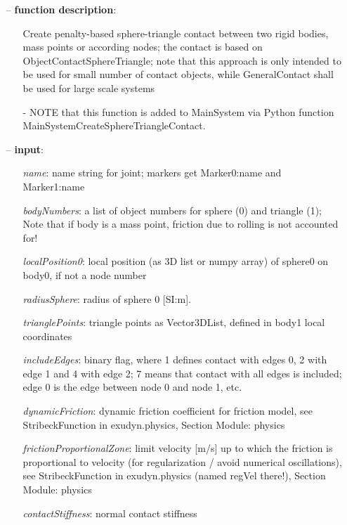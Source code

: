 \begin{itemize}[leftmargin=0.7cm]
\item[--]
{\bf function description}: \vspace{-6pt}
\begin{itemize}[leftmargin=1.2cm]
\setlength{\itemindent}{-0.7cm}
\item[]Create penalty-based sphere-triangle contact between two rigid bodies, mass points or according nodes; the contact is based on ObjectContactSphereTriangle; note that this approach is only intended to be used for small number of contact objects, while GeneralContact shall be used for large scale systems
\item[]- NOTE that this function is added to MainSystem via Python function MainSystemCreateSphereTriangleContact.
\end{itemize}
\item[--]
{\bf input}: \vspace{-6pt}
\begin{itemize}[leftmargin=1.2cm]
\setlength{\itemindent}{-0.7cm}
\item[]{\it name}: name string for joint; markers get Marker0:name and Marker1:name
\item[]{\it bodyNumbers}: a list of object numbers for sphere (0) and triangle (1); Note that if body is a mass point, friction due to rolling is not accounted for!
\item[]{\it localPosition0}: local position (as 3D list or numpy array) of sphere0 on body0, if not a node number
\item[]{\it radiusSphere}: radius of sphere 0 [SI:m].
\item[]{\it trianglePoints}: triangle points as Vector3DList, defined in body1 local coordinates
\item[]{\it includeEdges}: binary flag, where 1 defines contact with edges 0, 2 with edge 1 and 4 with edge 2; 7 means that contact with all edges is included; edge 0 is the edge between node 0 and node 1, etc.
\item[]{\it dynamicFriction}: dynamic friction coefficient for friction model, see StribeckFunction in exudyn.physics, Section Module: physics
\item[]{\it frictionProportionalZone}: limit velocity [m/s] up to which the friction is proportional to velocity (for regularization / avoid numerical oscillations), see StribeckFunction in exudyn.physics (named regVel there!), Section Module: physics
\item[]{\it contactStiffness}: normal contact stiffness

\end{itemize}
\end{itemize}
